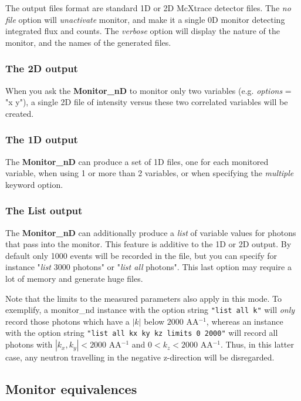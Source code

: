 The output files format are standard 1D or 2D McXtrace detector files.
The \textit{no file} option will \textit{unactivate} monitor, and make it a
single 0D monitor detecting integrated flux and counts.
The \textit{verbose} option will display the nature of the monitor, and the
names of the generated files.

\subsubsection{The 2D output}

When you ask the \textbf{Monitor\_nD} to monitor only two variables (e.g.
\textit{options} = "x y"), a single 2D file of intensity versus these two
correlated variables will be created.

\subsubsection{The 1D output}

The \textbf{Monitor\_nD} can produce a set of 1D files, one for each
monitored variable, when using 1 or more than 2 variables, or when
specifying the \textit{multiple} keyword option.

\subsubsection{The List output}

The \textbf{Monitor\_nD} can additionally produce a \textit{list} of variable
values for photons that pass into the monitor. This feature is additive
to the 1D or 2D output. By default only 1000 events will be recorded in
the file, but you can specify for instance "\textit{list} 3000 photons" or
"\textit{list all} photons". This last option may require a lot of
memory and generate huge files.

Note that the limits to the measured parameters also apply in this mode.
To exemplify, a monitor\_nd instance with the option string \verb+"list all k"+ will \emph{only} record those photons which have a $|k|$ below $2000$ AA$^{-1}$,
whereas an instance with the option string \verb+"list all kx ky kz limits 0 2000"+ will record all photons with $|k_x,k_y|<2000$ AA$^{-1}$ and $0<k_z<2000$ AA$^{-1}$.
Thus, in this latter case, any neutron travelling in the negative z-direction will be disregarded.

\subsection{Monitor equivalences}

